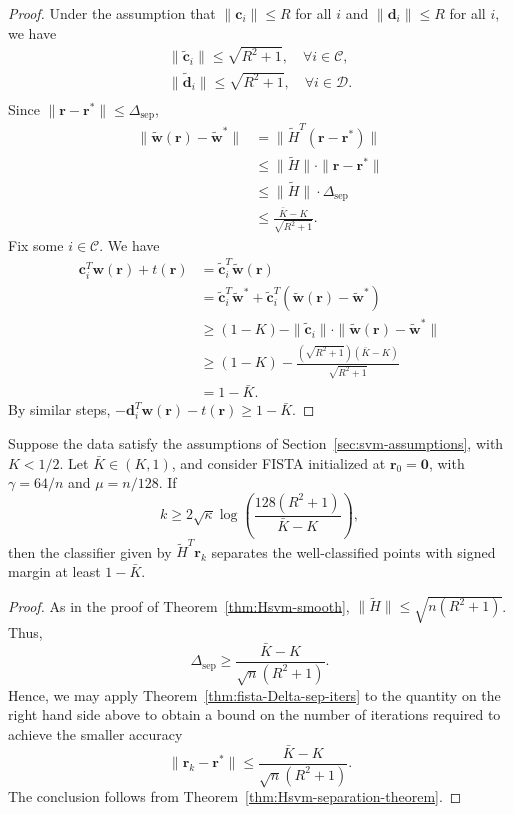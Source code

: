 \documentclass[twoside,11pt]{article}
\newcommand\bz{\bm{0}}
\renewcommand{\c}{\bm{c}}
\renewcommand{\d}{\bm{d}}
\renewcommand\r{\bm{r}}
\newcommand\w{\bm{w}}
\newcommand\CC{\mathcal{C}}
\newcommand\DD{\mathcal{D}}
\newcommand\tw{\tilde{\w}}
\newcommand\tc{\tilde{\c}}
\newcommand\td{\tilde{\d}}
\newcommand\tH{\tilde{H}}
\newcommand\sep{\mathrm{sep}}
\begin{document}
    \begin{proof}
        Under the assumption that $\|\c_i\| \leq R$ for all $i$ and $\|\d_i\| \leq R$ for all $i$, we have
        \begin{align*}
            \|\tc_i\| \leq \sqrt{R^2 + 1},\quad\forall i \in \CC,\\
            \|\td_i\| \leq \sqrt{R^2 + 1},\quad\forall i \in \DD.\\
        \end{align*}
        Since $\|\r - \r^*\| \leq \Delta_{\sep}$,
        \begin{align*}
            \|\tw(\r) - \tw^*\| &= \|\tH^T(\r - \r^*)\|\\
                            &\leq \|\tH\| \cdot \|\r - \r^*\|\\
                            &\leq \|\tH\| \cdot \Delta_{\sep}\\
                            &\leq \frac{\bar{K} - K}{\sqrt{R^2 + 1}}.
        \end{align*}
        Fix some $i \in \CC$. We have
        \begin{align*}
            \c_i^T\w(\r) + t(\r) &= \tc_i^T\tw(\r)\\
                         &= \tc_i^T\tw^* + \tc_i^T(\tw(\r) - \tw^*)\\
                         &\geq (1-K) - \|\tc_i\|\cdot \|\tw(\r) - \tw^*\|\\
                         &\geq (1-K) - \frac{\left(\sqrt{R^2 + 1}\right)\left(\bar{K} - K\right)}{\sqrt{R^2 + 1}}\\
                         &= 1 - \bar{K}.
        \end{align*}
        By similar steps, $-\d_i^T\w(\r) - t(\r) \geq 1 - \bar{K}$.
    \end{proof}

    \begin{corollary} \label{cor:fista-sep-complexity}
    Suppose the data satisfy the assumptions of Section~\ref{sec:svm-assumptions}, with $K<1/2$. Let $\bar{K} \in (K,1)$, and consider FISTA initialized
    at $\r_0 = \bz$, with $\gamma=64/n$ and $\mu=n/128$.
    If
    \[
        k \geq 2\sqrt{\kappa}\log\left(\frac{128(R^2 + 1)}{\bar{K} - K}\right),
    \]
    then the classifier given by $\tH^T\r_k$ separates the well-classified points with signed margin at least $1 - \bar{K}$.
    \end{corollary}
    \begin{proof}
        As in the proof of Theorem~\ref{thm:Hsvm-smooth}, $\|\tH\| \leq \sqrt{n(R^2 + 1)}$. Thus,
        \[
            \Delta_{\sep} \geq \frac{\bar{K} - K}{\sqrt{n}(R^2 + 1)}.
        \]
        Hence, we may apply Theorem~\ref{thm:fista-Delta-sep-iters} to the quantity on the right hand side above to obtain a bound on the number of iterations required to achieve the smaller accuracy
        \[
            \|\r_k - \r^*\| \leq \frac{\bar{K} - K}{\sqrt{n}(R^2 + 1)}.
        \]
        The conclusion follows from Theorem~\ref{thm:Hsvm-separation-theorem}.
    \end{proof}
    
\end{document}
